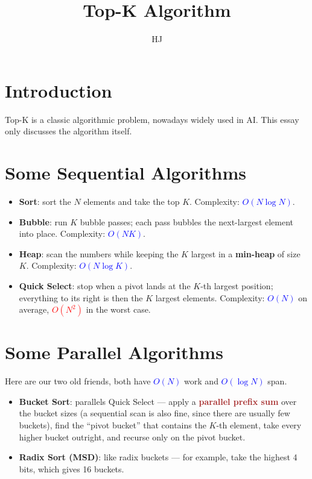 \documentclass{article}
\title{Top-K Algorithm}
\author{HJ}
\makeatletter
\renewcommand{\maketitle}{%
    \begin{center}
        {\Large\bfseries \@title\par}\vspace{0.1em}
        {\normalsize \@author\par}\vspace{0.1em}
        {\small \@date\par}
    \end{center}\vspace{0.4em}
}
\makeatother
\begin{document}
\maketitle
\section{Introduction}
Top-K is a classic algorithmic problem, nowadays widely used in AI. This essay only discusses the algorithm itself.

\section{Some Sequential Algorithms}
\begin{itemize}
    \item \textbf{Sort}: sort the $N$ elements and take the top $K$. Complexity: \textcolor{blue}{\textbf{$O(N \log N)$}}.
    \item \textbf{Bubble}: run $K$ bubble passes; each pass bubbles the next-largest element into place. Complexity: \textcolor{blue}{\textbf{$O(N K)$}}.
    \item \textbf{Heap}: scan the numbers while keeping the $K$ largest in a \textbf{min-heap} of size $K$. Complexity: \textcolor{blue}{\textbf{$O(N \log K)$}}.
    \item \textbf{Quick Select}: stop when a pivot lands at the $K$-th largest position; everything to its right is then the $K$ largest elements. Complexity: \textcolor{blue}{\textbf{$O(N)$}} on average, \textcolor{red}{\textbf{$O(N^2)$}} in the worst case.
\end{itemize}

\section{Some Parallel Algorithms}
Here are our two old friends, both have \textcolor{blue}{\textbf{$O(N)$}} work and \textcolor{blue}{\textbf{$O(\log N)$}} span.
\begin{itemize}
    \item \textbf{Bucket Sort}: parallels Quick Select --- apply a \textcolor{brown}{\textbf{parallel prefix sum}} over the bucket sizes (a sequential scan is also fine, since there are usually few buckets), find the ``pivot bucket'' that contains the $K$-th element, take every higher bucket outright, and recurse only on the pivot bucket.
    \item \textbf{Radix Sort (MSD)}: like radix buckets --- for example, take the highest 4 bits, which gives 16 buckets.
\end{itemize}
\end{document}
